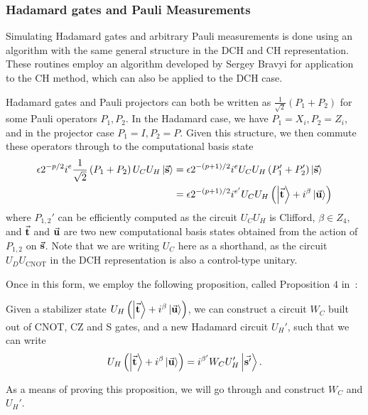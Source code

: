 \subsubsection*{Hadamard gates and Pauli Measurements}
Simulating Hadamard gates and arbitrary Pauli measurements is done using an algorithm with the same general structure in the DCH and CH representation. These routines employ an algorithm developed by Sergey Bravyi for application to the CH method,  which can also be applied to the DCH case.\par
Hadamard gates and Pauli projectors can both be written as $\frac{1}{\sqrt{2}}\left(P_{1}+P_{2}\right)$ for some Pauli operators $P_{1},P_{2}$. In the Hadamard case, we have $P_{1}=X_{i},P_{2}=Z_{i}$, and in the projector case $P_{1}=I,P_{2}=P$. Given this structure, we then commute these operators through to the computational basis state
\begin{align*}
\epsilon 2^{-p/2}i^{e}\frac{1}{\sqrt{2}}\left(P_{1}+P_{2}\right)U_{C}U_{H}\ket{\va{s}} &=
\epsilon 2^{-(p+1)/2}i^{e} U_{C}U_{H}\left(P_{1}'+P_{2}'\right)\ket{\va{s}} \\ 
&= \epsilon 2^{-(p+1)/2}i^{e'} U_{C}U_{H}\left(\ket{\va{t}}+i^{\beta}\ket{\va{u}}\right)
\end{align*}
where $P_{1,2}'$ can be efficiently computed as the circuit $U_{C}U_{H}$ is Clifford, $\beta\in\mathbb{}Z_{4}$, and $\va{t}$ and $\va{u}$ are two new computational basis states obtained from the action of $P_{1,2}$ on $\va{s}$. Note that we are writing $U_{C}$ here as a shorthand, as the circuit $U_{D}U_{\text{CNOT}}$ in the DCH representation is also a control-type unitary.\par
Once in this form, we employ the following proposition, called Proposition $4$ in~\cite{Bravyi2018}:
\begin{prop}
\label{prop:pseudocz}
Given a stabilizer state $U_{H}\left(\ket{\va{t}}+i^{\beta}\ket{\va{u}}\right)$, we can construct a circuit $W_{C}$ built out of CNOT, CZ and S gates, and a new Hadamard circuit $U_{H}'$, such that we can write
\[U_{H}\left(\ket{\va{t}}+i^{\beta}\ket{\va{u}}\right) = i^{\beta'}W_{C}U_{H}'\ket{\va{s'}}.\]
\end{prop}
As a means of proving this proposition, we will go through and construct $W_{C}$ and $U_{H}'$.
